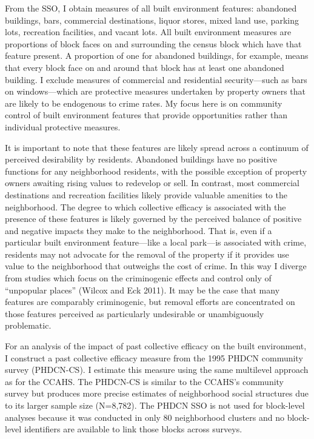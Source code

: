 \documentclass [11pt, proquest] {uwthesis}[2015/03/03]
\begin{document}
From the SSO, I obtain measures of all built environment features: abandoned buildings, bars, commercial destinations, liquor stores, mixed land use, parking lots, recreation facilities, and vacant lots. All built environment measures are proportions of block faces on and surrounding the census block which have that feature present. A proportion of one for abandoned buildings, for example, means that every block face on and around that block has at least one abandoned building. I exclude measures of commercial and residential security---such as bars on windows---which are protective measures undertaken by property owners that are likely to be endogenous to crime rates. My focus here is on community control of built environment features that provide opportunities rather than individual protective measures.

It is important to note that these features are likely spread across a continuum of perceived desirability by residents. Abandoned buildings have no positive functions for any neighborhood residents, with the possible exception of property owners awaiting rising values to redevelop or sell. In contrast, most commercial destinations and recreation facilities likely provide valuable amenities to the neighborhood. The degree to which collective efficacy is associated with the presence of these features is likely governed by the perceived balance of positive and negative impacts they make to the neighborhood. That is, even if a particular built environment feature---like a local park---is associated with crime, residents may not advocate for the removal of the property if it provides use value to the neighborhood that outweighs the cost of crime. In this way I diverge from studies which focus on the criminogenic effects and control only of ``unpopular places'' (Wilcox and Eck 2011). It may be the case that many features are comparably criminogenic, but removal efforts are concentrated on those features perceived as particularly undesirable or unambiguously problematic.

For an analysis of the impact of past collective efficacy on the built environment, I construct a past collective efficacy measure from the 1995 PHDCN community survey (PHDCN-CS). I estimate this measure using the same multilevel approach as for the CCAHS. The PHDCN-CS is similar to the CCAHS's community survey but produces more precise estimates of neighborhood social structures due to its larger sample size (N=8,782). The PHDCN SSO is not used for block-level analyses because it was conducted in only 80 neighborhood clusters and no block-level identifiers are available to link those blocks across surveys.
\end{document}
